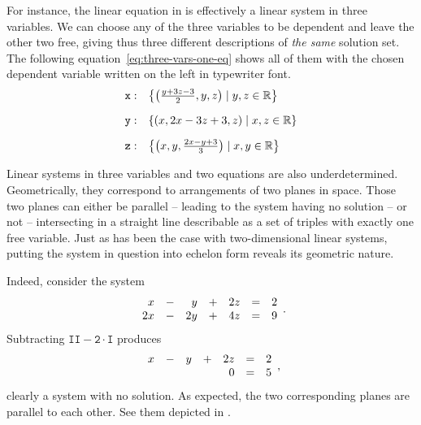 For instance, the linear equation in  is effectively a
linear system in three variables. We can choose any of the three variables to be
dependent and leave the other two free, giving thus three different descriptions
of \emph{the same} solution set. The following
equation~\eqref{eq:three-vars-one-eq} shows all of them with the chosen
dependent variable written on the left in typewriter font.
\begin{equation}
 \label{eq:three-vars-one-eq}
 \begin{array}{r l}
  \mathtt{x:} & \left\{ \left( \frac{y + 3z - 3}{2}, y, z \right) \mid y,z \in \mathbb{R}
  \right\}\\[1em]
  \mathtt{y:} & \left\{ \left( x, 2x - 3z + 3, z \right) \mid x,z \in \mathbb{R}
  \right\}\\[1em]
   \mathtt{z:} & \left\{ \left( x, y, \frac{2x - y + 3}{3} \right) \mid x,y \in
   \mathbb{R} \right\}
 \end{array}
\end{equation}

Linear systems in three variables and two equations are also underdetermined.
Geometrically, they correspond to arrangements of two planes in space. Those two
planes can either be parallel -- leading to the system having no solution -- or
not -- intersecting in a straight line describable as a set of triples with
exactly one free variable. Just as has been the case with two-dimensional linear
systems, putting the system in question into echelon form reveals its geometric
nature.

Indeed, consider the system
\begin{equation}
 \label{eq:two-parallel-planes}
 \begin{array}{r c r c r c r}
  x & - & y & + & 2z & = & 2\\
  2x & - & 2y & + & 4z & = & 9
 \end{array}.
\end{equation}
Subtracting $\mathtt{II - 2 \cdot I}$ produces
\[
 \begin{array}{r c r c r c r}
  x & - & y & + & 2z & = & 2\\
    &   &   &   &  0 & = & 5
 \end{array},
\]
clearly a system with no solution. As expected, the two corresponding planes are
parallel to each other. See them depicted in
.

